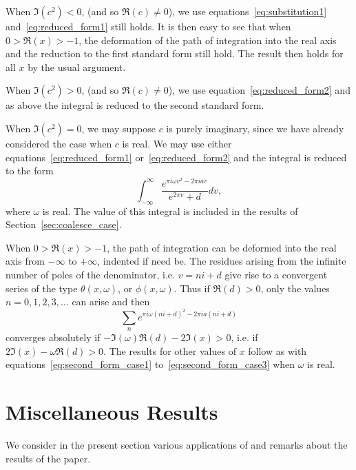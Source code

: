 \documentclass[12pt]{article}
\theoremstyle{remark}
\begin{document}
When $\Im(c^2) < 0$, (and so $\Re(c) \neq 0$), we use equations~\eqref{eq:substitution1} and~\eqref{eq:reduced_form1} still holds. It is then easy to see that when $0 > \Re(x) > -1$, the deformation of the path of integration into the real axis and the reduction to the first standard form still hold. The result then holds for all $x$ by the usual argument.

When $\Im(c^2) > 0$, (and so $\Re(c) \neq 0$), we use equation~\eqref{eq:reduced_form2} and as above the integral is reduced to the second standard form.

When $\Im(c^2) = 0$, we may suppose $c$ is purely imaginary, since we have already considered the case when $c$ is real. We may use either equations~\eqref{eq:reduced_form1} or~\eqref{eq:reduced_form2} and the integral is reduced to the form
\begin{equation}\label{eq:real_omega_case}
\int_{-\infty}^\infty \frac{e^{\pi i\omega v^2 - 2\pi iav}}{e^{2\pi v} + d} dv,
\end{equation}
where $\omega$ is real. The value of this integral is included in the results of Section~\ref{sec:coalesce_case}.

When $0 > \Re(x) > -1$, the path of integration can be deformed into the real axis from $-\infty$ to $+\infty$, indented if need be. The residues arising from the infinite number of poles of the denominator, i.e. $v = ni + d$ give rise to a convergent series of the type $\theta(x, \omega)$, or $\phi(x, \omega)$. Thus if $\Re(d) > 0$, only the values $n = 0, 1, 2, 3, \ldots$ can arise and then
\begin{equation}\label{eq:residue_series}
\sum_n e^{\pi i\omega(ni + d)^2 - 2\pi ia(ni + d)}
\end{equation}
converges absolutely if $-\Im(\omega)\Re(d) - 2\Im(x) > 0$, i.e. if $2\Im(x) - \omega\Re(d) > 0$. The results for other values of $x$ follow as with equations~\eqref{eq:second_form_case1} to~\eqref{eq:second_form_case3} when $\omega$ is real.

\section{Miscellaneous Results}\label{sec:miscellaneous_results}

We consider in the present section various applications of and remarks about the results of the paper.
\end{document}
